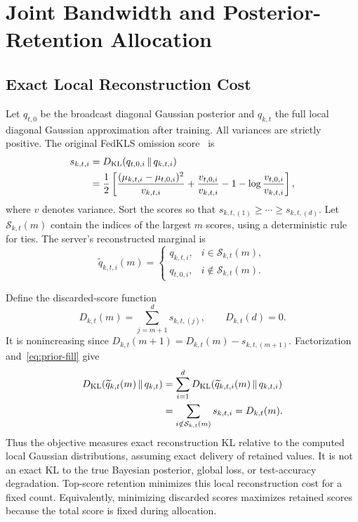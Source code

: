 \section{Joint Bandwidth and Posterior-Retention Allocation}
\label{sec:problem}
\subsection{Exact Local Reconstruction Cost}
Let $q_{t,0}$ be the broadcast diagonal Gaussian posterior and $q_{k,t}$ the full local diagonal Gaussian approximation after training. All variances are strictly positive. The original FedKLS omission score~\cite[Sec.~II-A]{fedkls} is
\begin{align}
 s_{k,t,i}&=D_{\mathrm{KL}}\!\left(q_{t,0,i}\,\|\,q_{k,t,i}\right)\notag\\
 &=\frac{1}{2}\left[
 \frac{(\mu_{k,t,i}-\mu_{t,0,i})^2}{v_{k,t,i}}
 +\frac{v_{t,0,i}}{v_{k,t,i}}
 -1-\log\frac{v_{t,0,i}}{v_{k,t,i}}\right],
 \label{eq:score}
\end{align}
where $v$ denotes variance. Sort the scores so that $s_{k,t,(1)}\ge\cdots\ge s_{k,t,(d)}$. Let $\mathcal S_{k,t}(m)$ contain the indices of the largest $m$ scores, using a deterministic rule for ties. The server's reconstructed marginal is
\begin{equation}
 \widetilde q_{k,t,i}(m)=
 \begin{cases}
 q_{k,t,i},&i\in\mathcal S_{k,t}(m),\\
 q_{t,0,i},&i\notin\mathcal S_{k,t}(m).
 \end{cases}
 \label{eq:prior-fill}
\end{equation}

Define the discarded-score function
\begin{equation}
 D_{k,t}(m)=\sum_{j=m+1}^{d}s_{k,t,(j)},\qquad D_{k,t}(d)=0.
 \label{eq:discarded}
\end{equation}
It is nonincreasing since $D_{k,t}(m+1)=D_{k,t}(m)-s_{k,t,(m+1)}$. Factorization and~\eqref{eq:prior-fill} give
\begin{align}
 D_{\mathrm{KL}}\!\left(\widetilde q_{k,t}(m)\,\|\,q_{k,t}\right)
 &=\sum_{i=1}^{d}D_{\mathrm{KL}}\!\left(\widetilde q_{k,t,i}(m)\,\|\,q_{k,t,i}\right)\notag\\
 &=\sum_{i\notin\mathcal S_{k,t}(m)}s_{k,t,i}
 =D_{k,t}(m).
 \label{eq:exact-kl}
\end{align}
Thus the objective measures exact reconstruction KL relative to the computed local Gaussian distributions, assuming exact delivery of retained values. It is not an exact KL to the true Bayesian posterior, global loss, or test-accuracy degradation. Top-score retention minimizes this local reconstruction cost for a fixed count. Equivalently, minimizing discarded scores maximizes retained scores because the total score is fixed during allocation.

